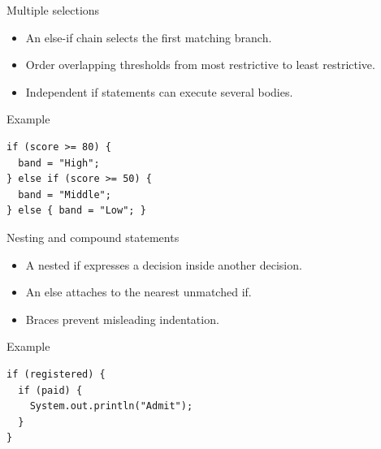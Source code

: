 \documentclass[10pt,aspectratio=169]{beamer}
\begin{document}
\begin{frame}[fragile,t]{Multiple selections}
\begin{itemize}
\item An else-if chain selects the first matching branch.
\item Order overlapping thresholds from most restrictive to least restrictive.
\item Independent if statements can execute several bodies.
\end{itemize}
\vspace{1mm}\begin{block}{Example}
\begin{lstlisting}
if (score >= 80) {
  band = "High";
} else if (score >= 50) {
  band = "Middle";
} else { band = "Low"; }
\end{lstlisting}
\end{block}
\end{frame}

\begin{frame}[fragile,t]{Nesting and compound statements}
\begin{itemize}
\item A nested if expresses a decision inside another decision.
\item An else attaches to the nearest unmatched if.
\item Braces prevent misleading indentation.
\end{itemize}
\vspace{1mm}\begin{block}{Example}
\begin{lstlisting}
if (registered) {
  if (paid) {
    System.out.println("Admit");
  }
}
\end{lstlisting}
\end{block}
\end{frame}
\end{document}
